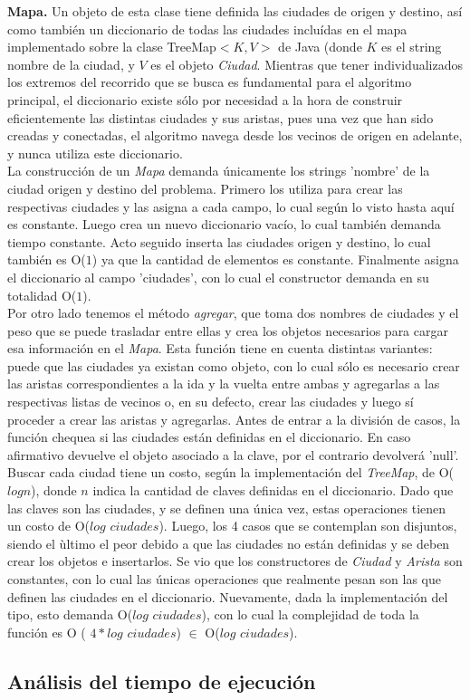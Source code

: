 \indent \textbf{Mapa.} Un objeto de esta clase tiene definida las ciudades de origen y destino, así como también un diccionario de todas las ciudades incluídas en el mapa implementado sobre la clase TreeMap$<K,V>$ de Java (donde $K$ es el string nombre de la ciudad, y $V$ es el objeto \textsl{Ciudad}. Mientras que tener individualizados los extremos del recorrido que se busca es fundamental para el algoritmo principal, el diccionario existe sólo por necesidad a la hora de construir eficientemente las distintas ciudades y sus aristas, pues una vez que han sido creadas y conectadas, el algoritmo navega desde los vecinos de origen en adelante, y nunca utiliza este diccionario.\\
\indent La construcción de un \textsl{Mapa} demanda únicamente los strings 'nombre' de la ciudad origen y destino del problema. Primero los utiliza para crear las respectivas ciudades y las asigna a cada campo, lo cual según lo visto hasta aquí es constante. Luego crea un nuevo diccionario vacío, lo cual también demanda tiempo constante. Acto seguido inserta las ciudades origen y destino, lo cual también es O($1$) ya que la cantidad de elementos es constante. Finalmente asigna el diccionario al campo 'ciudades', con lo cual el constructor demanda en su totalidad O($1$).\\
\indent Por otro lado tenemos el método \textsl{agregar}, que toma dos nombres de ciudades y el peso que se puede trasladar entre ellas y crea los objetos necesarios para cargar esa información en el \textsl{Mapa}. Esta función tiene en cuenta distintas variantes: puede que las ciudades ya existan como objeto, con lo cual sólo es necesario crear las aristas correspondientes a la ida y la vuelta entre ambas y agregarlas a las respectivas listas de vecinos o, en su defecto, crear las ciudades y luego sí proceder a crear las aristas y agregarlas. Antes de entrar a la división de casos, la función chequea si las ciudades están definidas en el diccionario. En caso afirmativo devuelve el objeto asociado a la clave, por el contrario devolverá 'null'. Buscar cada ciudad tiene un costo, según la implementación del \textsl{TreeMap}, de O($log n$), donde $n$ indica la cantidad de claves definidas en el diccionario. Dado que las claves son las ciudades, y se definen una única vez, estas operaciones tienen un costo de O($log$ $ciudades$). Luego, los 4 casos que se contemplan son disjuntos, siendo el ùltimo el peor debido a que las ciudades no están definidas y se deben crear los objetos e insertarlos. Se vio que los constructores de \textsl{Ciudad} y \textsl{Arista} son constantes, con lo cual las únicas operaciones que realmente pesan son las que definen las ciudades en el diccionario. Nuevamente, dada la implementación del tipo, esto demanda O($log$ $ciudades$), con lo cual la complejidad de toda la función es O ( $ 4 * log$ $ciudades$) $\in$ O($log$ $ciudades$).

\subsection{Análisis del tiempo de ejecución}












